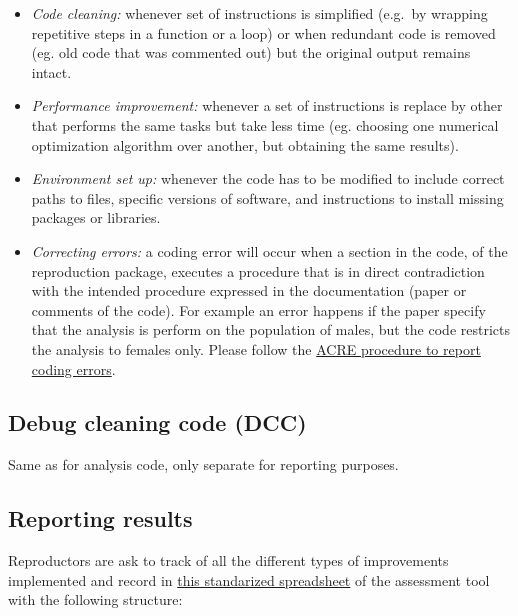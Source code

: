 \documentclass[]{book}
\providecommand{\tightlist}{%
  \setlength{\itemsep}{0pt}\setlength{\parskip}{0pt}}
\begin{document}
\begin{itemize}
\tightlist
\item
  \emph{Code cleaning:} whenever set of instructions is simplified (e.g.~by wrapping repetitive steps in a function or a loop) or when redundant code is removed (eg. old code that was commented out) but the original output remains intact.\\
\item
  \emph{Performance improvement:} whenever a set of instructions is replace by other that performs the same tasks but take less time (eg. choosing one numerical optimization algorithm over another, but obtaining the same results).\\
\item
  \emph{Environment set up:} whenever the code has to be modified to include correct paths to files, specific versions of software, and instructions to install missing packages or libraries.\\
\item
  \emph{Correcting errors:} a coding error will occur when a section in the code, of the reproduction package, executes a procedure that is in direct contradiction with the intended procedure expressed in the documentation (paper or comments of the code). For example an error happens if the paper specify that the analysis is perform on the population of males, but the code restricts the analysis to females only. Please follow the \href{ADD\%20LINK}{ACRE procedure to report coding errors}.
\end{itemize}

\hypertarget{debug-cleaning-code-dcc}{%
\subsection{Debug cleaning code (DCC)}\label{debug-cleaning-code-dcc}}

Same as for analysis code, only separate for reporting purposes.

\hypertarget{reporting-results}{%
\subsection{Reporting results}\label{reporting-results}}

Reproductors are ask to track of all the different types of improvements implemented and record in \href{https://docs.google.com/spreadsheets/d/1LUIdVFH0OfR70C7z07TYeE-uWzKI_JIeWUMaYhqEKK0/edit\#gid=0\&range=A3}{this standarized spreadsheet} of the assessment tool with the following structure:
\end{document}
